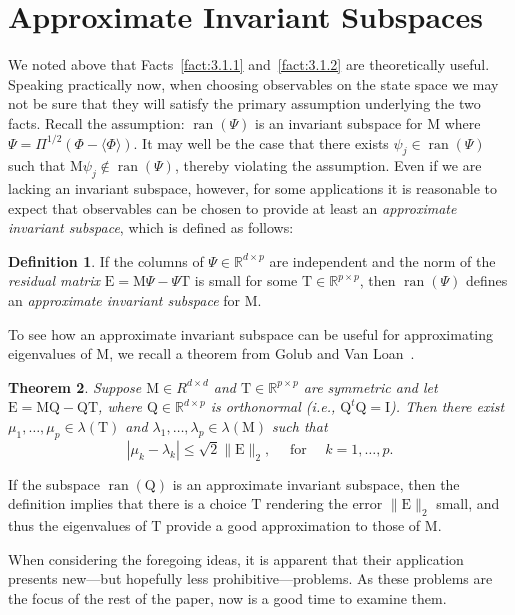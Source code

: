 \documentclass[12pt,letterpaper]{report}
\theoremstyle{plain}
\newtheorem{theorem}{Theorem}[chapter]
\theoremstyle{definition}
\newtheorem{definition}[theorem]{Definition}
\theoremstyle{remark}
\numberwithin{theorem}{chapter}
\numberwithin{claim}{chapter}
\numberwithin{equation}{chapter}
\numberwithin{conjecture}{chapter}
\newcommand\R{\ensuremath{\mathbb{R}}}
\newcommand\M{\ensuremath{\mathrm{M}}}
\newcommand\T{\ensuremath{\mathrm{T}}}
\newcommand\I{\ensuremath{\mathrm{I}}}
\newcommand\Q{\ensuremath{\mathrm{Q}}}
\newcommand\E{\ensuremath{\mathrm{E}}}
\newcommand\ran{\ensuremath{\operatorname{ran}}}
\newcommand\<{\ensuremath{\langle}}
\renewcommand\>{\ensuremath{\rangle}}
\begin{document}
\section{Approximate Invariant Subspaces}
\label{sec:appr-invar-subsp}
We noted above that Facts~\ref{fact:3.1.1} and~\ref{fact:3.1.2} are
theoretically useful. Speaking practically now,
when choosing observables on the state space we may not be sure that
they will satisfy the 
%
%
%
%
primary assumption underlying the two facts. %
Recall the assumption: $\ran(\Psi)$ is an invariant
subspace for $\M$ where $\Psi = \Pi^{1/2}(\Phi - \<\Phi\>)$. It may well be the
case that there exists $\psi_j\in \ran(\Psi)$ such that 
$\M\psi_j \notin \ran(\Psi)$, thereby violating the assumption. 
Even if we are lacking an invariant subspace, however, for some applications it
is reasonable to expect that observables can be chosen to provide at least
an \emph{approximate invariant subspace}, which is defined as follows:
\begin{definition}
If the columns of $\Psi\in \R^{d\times p}$ are independent and the norm of the
\emph{residual matrix} $\E = \M\Psi - \Psi \T$ is small for some  
$\T \in \R^{p\times p}$, then
$\ran(\Psi)$ defines an \emph{approximate invariant subspace} for $\M$. 
\end{definition}
To see how an approximate invariant subspace can be useful for approximating
eigenvalues of $\M$, we recall a theorem from Golub and Van Loan~\cite{Golub:1996}.
\begin{theorem}
\label{thm:3.2.1}  
Suppose $\M \in R^{d\times d}$ and $\T \in \R^{p\times p}$ are symmetric and let
$\E = \M\Q - \Q\T$, where $\Q \in \R^{d\times p}$ is orthonormal 
(i.e., $\Q^t\Q = \I$). Then there exist $\mu_1,\dots, \mu_p \in \lambda(\T)$ and
$\lambda_1, \dots, \lambda_p \in \lambda(\M)$ such that
\[
|\mu_k - \lambda_k| \leq \sqrt{2}\|\E\|_2, \quad \text{ for } \quad k = 1, \dots, p.
\]
\end{theorem}
If the subspace $\ran(\Q)$ is an approximate invariant subspace, then the definition implies that
there is a choice $\T$ rendering the error $\|\E\|_2$ small, and thus the
eigenvalues of $\T$ provide a good approximation to those of $\M$.

When considering the foregoing ideas, it is apparent that their application
presents new---but hopefully less prohibitive---problems. As these problems
are the focus of the rest of the paper, now is a good time to examine
them. 
\end{document}
